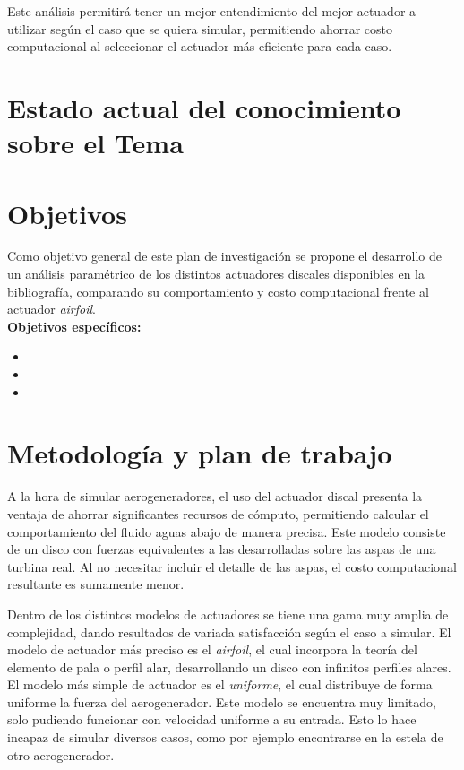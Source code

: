 \documentclass{article}
\numberwithin{equation}{subsection}
\begin{document}
Este análisis permitirá tener un mejor entendimiento del mejor actuador a utilizar según el caso que se quiera simular, permitiendo ahorrar costo computacional al seleccionar el actuador más eficiente para cada caso.

\section{Estado actual del conocimiento sobre el Tema}


\section{Objetivos}
Como objetivo general de este plan de investigación se propone el desarrollo de un análisis paramétrico de los distintos actuadores discales disponibles en la bibliografía, comparando su comportamiento y costo computacional frente al actuador \textit{airfoil}.\\

\textbf{Objetivos específicos:}
\begin{itemize}
	\item 
	\item 
	\item 
\end{itemize}

\section{Metodología y plan de trabajo}
A la hora de simular aerogeneradores, el uso del actuador discal presenta la ventaja de ahorrar significantes recursos de cómputo, permitiendo calcular el comportamiento del fluido aguas abajo de manera precisa. Este modelo consiste de un disco con fuerzas equivalentes a las desarrolladas sobre las aspas de una turbina real. Al no necesitar incluir el detalle de las aspas, el costo computacional resultante es sumamente menor.

Dentro de los distintos modelos de actuadores se tiene una gama muy amplia de complejidad, dando resultados de variada satisfacción según el caso a simular. El modelo de actuador más preciso es el \textit{airfoil}, el cual incorpora la teoría del elemento de pala o perfil alar, desarrollando un disco con infinitos perfiles alares. El modelo más simple de actuador es el \textit{uniforme}, el cual distribuye de forma uniforme la fuerza del aerogenerador. Este modelo se encuentra muy limitado, solo pudiendo funcionar con velocidad uniforme a su entrada. Esto lo hace incapaz de simular diversos casos, como por ejemplo encontrarse en la estela de otro aerogenerador.
\end{document}
